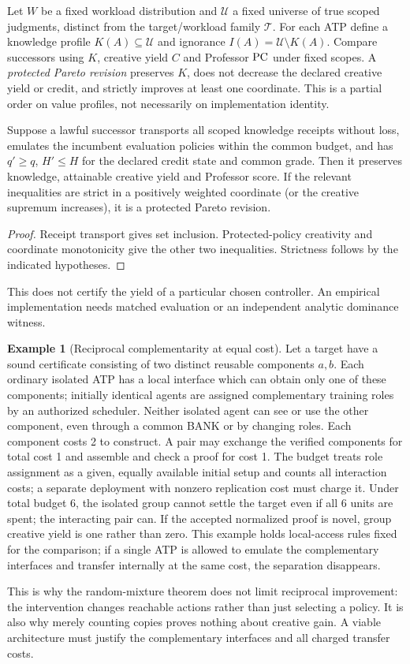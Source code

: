 \documentclass[11pt]{article}
\theoremstyle{definition}\newtheorem{definition}[theorem]{Definition}\newtheorem{conjecture}[theorem]{Conjecture}\newtheorem{example}[theorem]{Example}
\begin{document}
Let $W$ be a fixed workload distribution and $\mathcal U$ a fixed universe of true scoped judgments, distinct from the target/workload family $\mathcal T$. For each ATP define a knowledge profile $K(A)\subseteq\mathcal U$ and ignorance $I(A)=\mathcal U\setminus K(A)$. Compare successors using $K$, creative yield $C$ and Professor $\operatorname{PC}$ under fixed scopes. A \emph{protected Pareto revision} preserves $K$, does not decrease the declared creative yield or credit, and strictly improves at least one coordinate. This is a partial order on value profiles, not necessarily on implementation identity.
\begin{proposition}
Suppose a lawful successor transports all scoped knowledge receipts without loss, emulates the incumbent evaluation policies within the common budget, and has $q'\ge q$, $H'\le H$ for the declared credit state and common grade. Then it preserves knowledge, attainable creative yield and Professor score. If the relevant inequalities are strict in a positively weighted coordinate (or the creative supremum increases), it is a protected Pareto revision.
\end{proposition}
\begin{proof}Receipt transport gives set inclusion. Protected-policy creativity and coordinate monotonicity give the other two inequalities. Strictness follows by the indicated hypotheses.\end{proof}
This does not certify the yield of a particular chosen controller. An empirical implementation needs matched evaluation or an independent analytic dominance witness.

\begin{example}[Reciprocal complementarity at equal cost]
Let a target have a sound certificate consisting of two distinct reusable components $a,b$. Each ordinary isolated ATP has a local interface which can obtain only one of these components; initially identical agents are assigned complementary training roles by an authorized scheduler. Neither isolated agent can see or use the other component, even through a common BANK or by changing roles. Each component costs 2 to construct. A pair may exchange the verified components for total cost 1 and assemble and check a proof for cost 1. The budget treats role assignment as a given, equally available initial setup and counts all interaction costs; a separate deployment with nonzero replication cost must charge it. Under total budget 6, the isolated group cannot settle the target even if all 6 units are spent; the interacting pair can. If the accepted normalized proof is novel, group creative yield is one rather than zero. This example holds local-access rules fixed for the comparison; if a single ATP is allowed to emulate the complementary interfaces and transfer internally at the same cost, the separation disappears.
\end{example}
This is why the random-mixture theorem does not limit reciprocal improvement: the intervention changes reachable actions rather than just selecting a policy. It is also why merely counting copies proves nothing about creative gain. A viable architecture must justify the complementary interfaces and all charged transfer costs.
\end{document}
